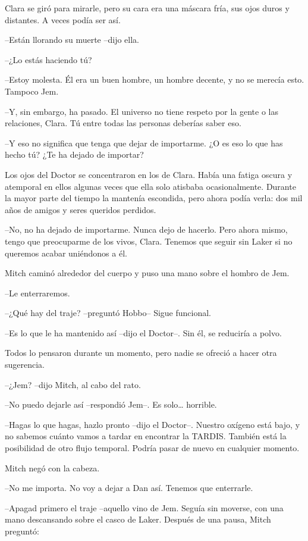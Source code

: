 {Clara se giró para mirarle, pero su cara era una máscara fría, sus ojos
duros y distantes. A veces podía ser así.}

{--Están llorando su muerte --dijo ella.}

{--¿Lo estás haciendo tú?}

{--Estoy molesta. Él era un buen hombre, un hombre decente, y no se
merecía esto. Tampoco Jem.}

{--Y, sin embargo, ha pasado. El universo no tiene respeto por la gente o
las relaciones, Clara. Tú entre todas las personas deberías saber eso.}

{--Y eso no significa que tenga que dejar de importarme. ¿O es eso lo que
has hecho tú? ¿Te ha dejado de importar?}

{Los ojos del Doctor se concentraron en los de Clara. Había una fatiga
 oscura y atemporal en ellos algunas veces que ella solo atisbaba
 ocasionalmente. Durante la mayor parte del tiempo la mantenía escondida,
 pero ahora podía verla: dos mil años de amigos y seres queridos
perdidos.}

{--No, no ha dejado de importarme. Nunca dejo de hacerlo. Pero ahora
 mismo, tengo que preocuparme de los vivos, Clara. Tenemos que seguir sin
Laker si no queremos acabar uniéndonos a él.}

{Mitch caminó alrededor del cuerpo y puso una mano sobre el hombro de
Jem.}

{--Le enterraremos.}

{--¿Qué hay del traje? --preguntó Hobbo-- Sigue funcional.}

{--Es lo que le ha mantenido así --dijo el Doctor--. Sin él, se reduciría
a polvo.}

{Todos lo pensaron durante un momento, pero nadie se ofreció a hacer otra
sugerencia.}

{--¿Jem? --dijo Mitch, al cabo del rato.}

{--No puedo dejarle así --respondió Jem--. Es solo\ldots{} horrible.}

{--Hagas lo que hagas, hazlo pronto --dijo el Doctor--. Nuestro oxígeno
 está bajo, y no sabemos cuánto vamos a tardar en encontrar la TARDIS.\@
 También está la posibilidad de otro flujo temporal. Podría pasar de
nuevo en cualquier momento.}

{Mitch negó con la cabeza.}

{--No me importa. No voy a dejar a Dan así. Tenemos que enterrarle.}

{--Apagad primero el traje --aquello vino de Jem. Seguía sin moverse, con
 una mano descansando sobre el casco de Laker. Después de una pausa,
Mitch preguntó:}

